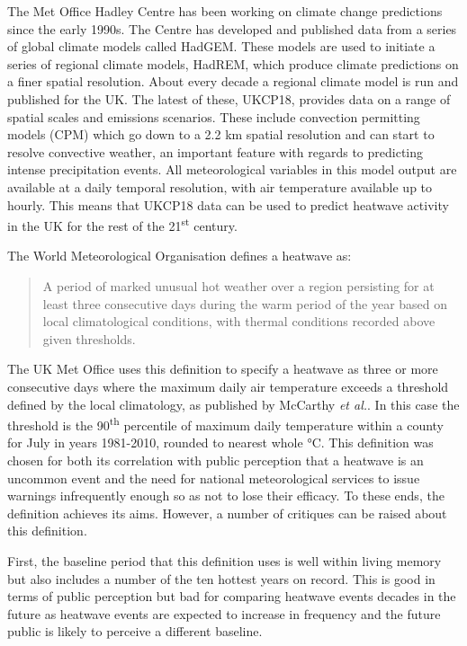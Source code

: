 \documentclass[10pt,letterpaper]{article}
\begin{document}
The Met Office Hadley Centre has been working on climate change predictions since the early 1990s.
The Centre has developed and published data from a series of global climate models called HadGEM.
These models are used to initiate a series of regional climate models, HadREM, which produce climate predictions on a finer spatial resolution.
About every decade a regional climate model is run and published for the UK.
The latest of these, UKCP18, provides data on a range of spatial scales and emissions scenarios.\cite{UKCP18}
These include convection permitting models (CPM) which go down to a 2.2 km spatial resolution and can start to resolve convective weather, an important feature with regards to predicting intense precipitation events.
All meteorological variables in this model output are available at a daily temporal resolution, with air temperature available up to hourly.
This means that UKCP18 data can be used to predict heatwave activity in the UK for the rest of the 21\textsuperscript{st} century.


The World Meteorological Organisation defines a heatwave as\cite{WMO2018}:
\begin{quote}
    A period of marked unusual hot weather over a region persisting for at least three consecutive days during the warm period of the year based on local climatological conditions, with thermal conditions recorded above given thresholds.
\end{quote}
The UK Met Office uses this definition to specify a heatwave as three or more consecutive days where the maximum daily air temperature exceeds a threshold defined by the local climatology, as published by McCarthy \textit{et al.}.\cite{McCarthy2019}
In this case the threshold is the 90{\textsuperscript{th}} percentile of maximum daily temperature within a county for July in years 1981-2010, rounded to nearest whole °C.
This definition was chosen for both its correlation with public perception that a heatwave is an uncommon event and the need for national meteorological services to issue warnings infrequently enough so as not to lose their efficacy.
To these ends, the definition achieves its aims.
However, a number of critiques can be raised about this definition.

First, the baseline period that this definition uses is well within living memory but also includes a number of the ten hottest years on record.\cite{McCarthy2019}
This is good in terms of public perception but bad for comparing heatwave events decades in the future as heatwave events are expected to increase in frequency and the future public is likely to perceive a different baseline.
\end{document}
